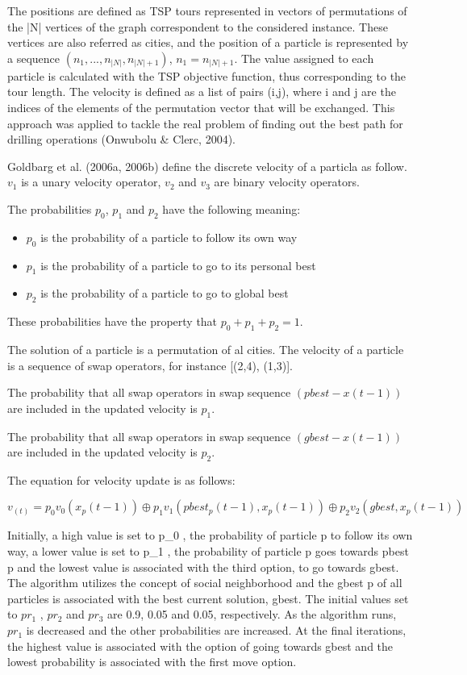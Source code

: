 The positions are defined as TSP tours represented in vectors of permutations of the |N| vertices of the graph correspondent to the considered instance. These vertices are also referred as cities, and the position of a particle is represented by a sequence $(n_1 , ..., n_{|N|}, n_{|N|+1})$, $n_1 = n_{|N|+1}$. The value assigned to each particle is calculated with the TSP objective function, thus corresponding to the tour length. The velocity is defined as a list of pairs (i,j), where i and j are the indices of the elements of the permutation vector that will be exchanged. This approach was applied to tackle the real problem of finding out the best path for drilling operations (Onwubolu \& Clerc, 2004). 


Goldbarg et al. (2006a, 2006b) define the discrete velocity of a particla as follow. $v_1$ is a unary velocity operator, $v_2$ and $v_3$ are binary velocity operators. 

The probabilities $p_0$, $p_1$ and $p_2$ have the following meaning:

\begin{itemize}

\item ${p_0}$ is the probability of a particle to follow its own way
\item ${p_1}$ is the probability of a particle to go to its personal best
\item ${p_2}$ is the probability of a particle to go to global best
\end{itemize}

These probabilities have the property that $p_0 + p_1 + p_2 = 1$.

The	solution of a particle is a	permutation	of al cities. The velocity of a	 particle is	 a	sequence	 of	swap	 operators, for instance [(2,4), (1,3)].

The probability that all swap operators in swap sequence $(pbest - x(t-1))$ are included in the updated velocity is $p_1$. 

The probability that all swap operators in swap sequence $(gbest - x(t-1))$ are included in the updated velocity is $p_2$.

The equation for velocity update is as follows:

$$
v_(t) = p_0 v_{0}(x_p(t-1)) \oplus p_1 v_1(pbest_{p}(t-1),x_{p}(t-1)) \oplus p_2 v_2(gbest, x_{p}(t-1))
$$

Initially, a high value is set to p_{0} , the probability of particle p to follow its own way, a lower value is set to p_{1} , the probability of particle p goes towards pbest p and the lowest value is associated with the third option, to go towards gbest. The algorithm utilizes the concept of social neighborhood and the gbest p of all particles is associated with the best current solution, gbest. The initial values set to $pr_1$ , $pr_2$ and $pr_3$ are 0.9, 0.05 and 0.05, respectively. As the algorithm runs, $pr_1$ is decreased and the other probabilities are increased. At the final iterations, the highest value is associated with the option of going towards gbest and the lowest probability is associated with the first move option.